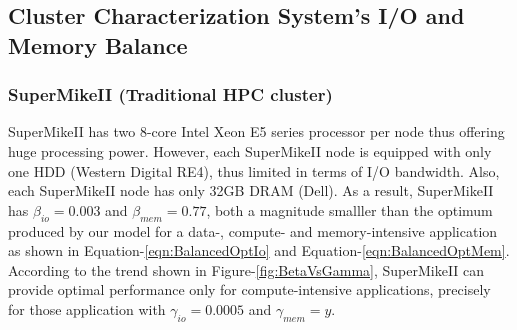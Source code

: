 \documentclass[journal]{IEEEtran}
\begin{document}
\subsection{Cluster Characterization System's I/O and Memory Balance}

\subsubsection{SuperMikeII (Traditional HPC cluster)}
SuperMikeII has two 8-core Intel Xeon E5 series processor per node thus offering huge processing power. However, each SuperMikeII node is equipped with only one HDD (Western Digital RE4), thus limited in terms of I/O bandwidth. Also, each SuperMikeII node has only 32GB DRAM (Dell). As a result, SuperMikeII has $\beta_{io}=0.003$ and $\beta_{mem}=0.77$, both a magnitude smalller than the optimum produced by our model for a data-, compute- and memory-intensive application as shown in Equation-\ref{eqn:BalancedOptIo} and Equation-\ref{eqn:BalancedOptMem}. According to the trend shown in Figure-\ref{fig:BetaVsGamma}, SuperMikeII can provide optimal performance only for compute-intensive applications, precisely for those application with $\gamma_{io}=0.0005$ and $\gamma_{mem}=y$.  
\end{document}
